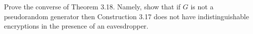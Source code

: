 \documentclass[a4paper,10pt,landscape,twocolumn]{scrartcl}
\begin{document}

\begin{bonusexercise}
Prove the converse of Theorem 3.18. Namely, show that if $G$ is not a pseudorandom generator then Construction 3.17 does not have indistinguishable encryptions in the presence of an eavesdropper.
\end{bonusexercise}
\end{document}
